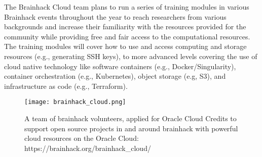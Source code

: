 \documentclass[../main.tex]{subfiles}
\begin{document}
The Brainhack Cloud team plans to run a series of training modules in various Brainhack events throughout the year to reach researchers from various backgrounds and increase their familiarity with the resources provided for the community while providing free and fair access to the computational resources. The training modules will cover how to use and access computing and storage resources (e.g., generating SSH keys), to more advanced levels covering the use of cloud native technology like software containers (e.g., Docker/Singularity), container orchestration (e.g., Kubernetes), object storage (e.g, S3), and infrastructure as code (e.g., Terraform).

\begin{figure}
    \centering
    \texttt{[image: brainhack\_cloud.png]}
    \caption{A team of brainhack volunteers, applied for Oracle Cloud Credits to support open source projects in and around brainhack with powerful cloud resources on the Oracle Cloud: https://brainhack.org/brainhack\_cloud/
    }
    \label{fig:cloud}
\end{figure}


\end{document}
